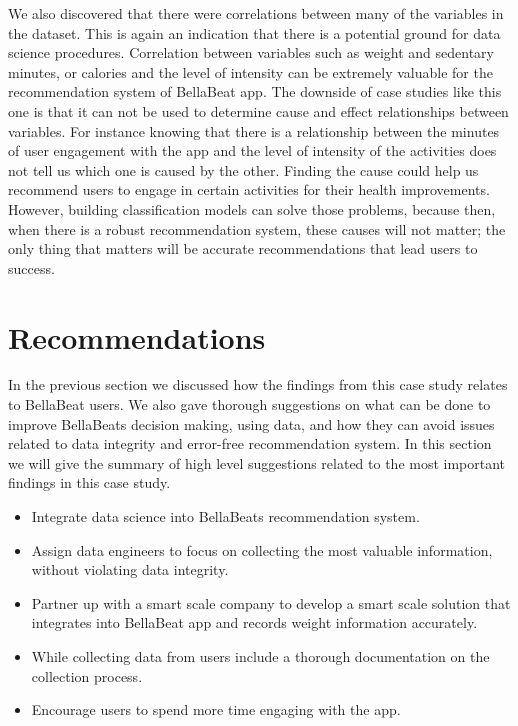\documentclass[
]{article}
\providecommand{\tightlist}{%
  \setlength{\itemsep}{0pt}\setlength{\parskip}{0pt}}
\begin{document}
We also discovered that there were correlations between many of the
variables in the dataset. This is again an indication that there is a
potential ground for data science procedures. Correlation between
variables such as weight and sedentary minutes, or calories and the
level of intensity can be extremely valuable for the recommendation
system of BellaBeat app. The downside of case studies like this one is
that it can not be used to determine cause and effect relationships
between variables. For instance knowing that there is a relationship
between the minutes of user engagement with the app and the level of
intensity of the activities does not tell us which one is caused by the
other. Finding the cause could help us recommend users to engage in
certain activities for their health improvements. However, building
classification models can solve those problems, because then, when there
is a robust recommendation system, these causes will not matter; the
only thing that matters will be accurate recommendations that lead users
to success.

\hypertarget{recommendations}{%
\section{Recommendations}\label{recommendations}}

In the previous section we discussed how the findings from this case
study relates to BellaBeat users. We also gave thorough suggestions on
what can be done to improve BellaBeats decision making, using data, and
how they can avoid issues related to data integrity and error-free
recommendation system. In this section we will give the summary of high
level suggestions related to the most important findings in this case
study.

\begin{itemize}
\tightlist
\item
  Integrate data science into BellaBeats recommendation system.
\item
  Assign data engineers to focus on collecting the most valuable
  information, without violating data integrity.
\item
  Partner up with a smart scale company to develop a smart scale
  solution that integrates into BellaBeat app and records weight
  information accurately.
\item
  While collecting data from users include a thorough documentation on
  the collection process.
\item
  Encourage users to spend more time engaging with the app.
\end{itemize}
\end{document}
